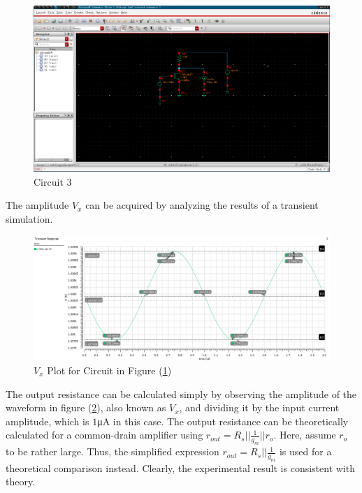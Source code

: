 \FloatBarrier

\begin{figure}[h!]
	\centering
	\includegraphics[scale=0.75]{../images/circuit4.PNG}
	\caption{Circuit 3}
	\label{fig:circuit3}
\end{figure}

\FloatBarrier
The amplitude $V_{x}$ can be acquired by analyzing the results of a transient simulation.

\FloatBarrier

\begin{figure}[h!]
	\centering
	\includegraphics[scale=0.75]{../images/sim3_vx.PNG}
	\caption{$V_{x}$ Plot for Circuit in Figure (\ref{fig:circuit3})}
	\label{fig:sim3_vx}
\end{figure}

\FloatBarrier

The output resistance can be calculated simply by observing the amplitude of the waveform in figure (\ref{fig:sim3_vx}), also known as $V_{x}$, and dividing it by the input current amplitude, which is $1$\si{\micro\ampere} in this case.
The output resistance can be theoretically calculated for a common-drain amplifier using $r_{out} = R_{s} || \frac{1}{g_{m}} || r_{o}$.
Here, assume $r_{o}$ to be rather large.
Thus, the simplified expression $r_{out} = R_{s} || \frac{1}{g_{m}}$ is used for a theoretical comparison instead.
Clearly, the experimental result is consistent with theory.


